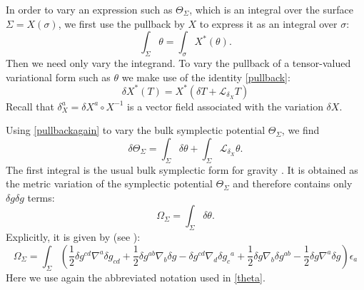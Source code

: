 \documentclass[a4paper,11pt]{article}
\begin{document}
In order to vary an expression such as $\Theta_\Sigma$, which is an integral over the surface $\Sigma = X(\sigma)$, we first use the pullback by $X$ to express it as an integral over $\sigma$:
\begin{equation}
\int_{\Sigma} \theta = \int_\sigma X^*(\theta).
\end{equation}
Then we need only vary the integrand.
To vary the pullback of a tensor-valued variational form such as $\theta$ we make use of the identity \eqref{pullback}:
\begin{equation} \label{pullbackagain}
\delta X^*(T) 
= X^*(\delta T + \mathcal{L}_{\delta_X} T) 
\end{equation}
Recall that $\delta_X^a= \delta X^a\circ X^{-1}$ is a vector field associated with the variation $\delta X$.

Using \eqref{pullbackagain} to vary the bulk symplectic potential $\Theta_\Sigma$, we find
\begin{equation} \label{deltathetasigma}
\delta \Theta_\Sigma = \int_{\Sigma} \delta \theta + \int_{\Sigma} \mathcal{L}_{\delta_X} \theta.
\end{equation}
The first integral is the usual bulk symplectic form for gravity \cite{Crnkovic:1987tz}.
It is obtained as the metric variation of the symplectic potential $\Theta_\Sigma$ and therefore contains only $\delta g \delta g$ terms:
\begin{equation}
\Omega_\Sigma = \int_{\Sigma} \delta \theta. 
\end{equation}
Explicitly, it is given by (see \cite{Hollands2012}):
\begin{equation}
\Omega_\Sigma = \int_{\Sigma} \left(
\frac12 \delta g^{cd} \nabla^a \delta g_{cd}
+\frac12 \delta g^{ab} \nabla_b \delta g 
- \delta g^{cd} \nabla_d \delta g_c{}^a
+\frac12 \delta g \nabla_b \delta g^{ab}
-\frac12 \delta g \nabla^a \delta g
\right) \epsilon_a
\end{equation}
Here we use again the abbreviated notation used in \eqref{theta}.
\end{document}
